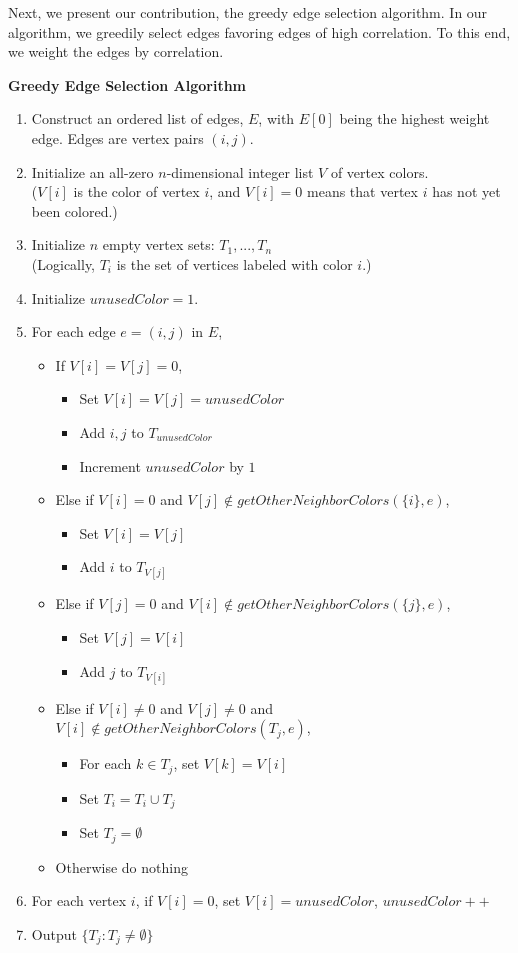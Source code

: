 \documentclass{article} %
\begin{document}
Next, we present our contribution, the greedy edge selection algorithm. In our algorithm, we greedily select edges favoring edges of high correlation. To this end, we weight the edges by correlation.

\begin{framed}
\noindent\textbf{Greedy Edge Selection Algorithm}
\begin{enumerate}
\item Construct an ordered list of edges, $E$, with $E[0]$ being the highest weight edge. Edges are vertex pairs $(i,j)$.
\item Initialize an all-zero $n$-dimensional integer list $V$ of vertex colors. \\
($V[i]$ is the color of vertex $i$, and $V[i]=0$ means that vertex $i$ has not yet been colored.)
\item Initialize $n$ empty vertex sets: $T_1,...,T_n$\\
(Logically, $T_i$ is the set of vertices labeled with color $i$.)
\item Initialize $unusedColor=1$.
\item For each edge $e=(i,j)$ in $E$,
\begin{itemize}
\item If $V[i]=V[j]=0$,
\begin{itemize}
\item Set $V[i]=V[j]=unusedColor$
\item Add $i,j$ to $T_{unusedColor}$
\item Increment $unusedColor$ by $1$
\end{itemize}
\item Else if $V[i]=0$ and $V[j]\notin getOtherNeighborColors(\{i\}, e)$,
\begin{itemize}
\item Set $V[i]=V[j]$
\item Add $i$ to $T_{V[j]}$
\end{itemize}
\item Else if $V[j]=0$ and $V[i]\notin getOtherNeighborColors(\{j\}, e)$,
\begin{itemize}
\item Set $V[j]=V[i]$
\item Add $j$ to $T_{V[i]}$
\end{itemize}
\item Else if  $V[i]\neq 0$ and $V[j]\neq 0$ and $V[i]\notin getOtherNeighborColors(T_j, e)$,
\begin{itemize}
\item For each $k\in T_j$, set $V[k]=V[i]$
\item Set $T_i=T_i\cup T_j$
\item Set $T_j=\emptyset$
\end{itemize}
\item Otherwise do nothing
\end{itemize}
\item For each vertex $i$, if $V[i]=0$, set $V[i]=unusedColor$, $unusedColor++$
\item Output $\{T_j:T_j\neq\emptyset\}$
\end{enumerate}
\vspace{5mm}


\end{framed}
\end{document}
